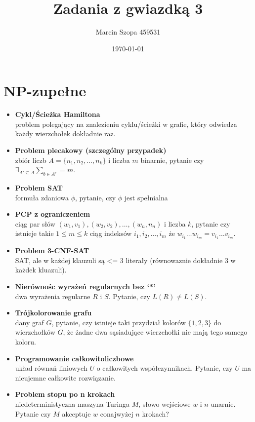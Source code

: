 \documentclass{article}
\title{Zadania z gwiazdką 3}
\author{Marcin Szopa 459531}
\date{\today}
\theoremstyle{definition}
\theoremstyle{remark}
\begin{document}
\section{NP-zupełne}

\begin{itemize}
    \item \textbf{Cykl/Ścieżka Hamiltona} \\
    problem polegający na znalezieniu cyklu/ścieżki w grafie, który odwiedza każdy wierzchołek dokładnie raz.
    
    \item \textbf{Problem plecakowy (szczególny przypadek)} \\
    zbiór liczb $A=\{n_1,n_2,\ldots,n_k\}$ i liczba $m$ binarnie, pytanie czy $\exists_{A' \subseteq A} \sum_{b \in A'}= m$.
    
    \item \textbf{Problem SAT} \\
    formuła zdaniowa $\phi$, pytanie, czy $\phi$ jest spełnialna

    \item \textbf{PCP z ograniczeniem} \\
    ciąg par słów $(w_1, v_1), (w_2, v_2), \ldots, (w_n, n_n)$ i liczba $k$,
     pytanie czy istnieje takie $1 \leq m \leq k$ ciąg indeksów $i_1, i_2, \ldots, i_m$ że $ w_{i_1} \ldots w_{i_m} = v_{i_1} \ldots v_{i_m}$.
    
    \item \textbf{Problem 3-CNF-SAT} \\
    SAT, ale w każdej klauzuli są <= 3 literały (równowaznie dokładnie 3 w każdek kluazuli).
    
    \item \textbf{Nierównośc wyrażeń regularnych bez `*'} \\
    dwa wyrażenia regularne $R$ i $S$. Pytanie, czy $L(R) \neq L(S)$.

    \item \textbf{Trójkolorowanie grafu} \\
    dany graf $G$, pytanie, czy istnieje taki przydział kolorów $\{1,2,3\}$ do wierzchołków $G$, że żadne dwa sąsiadujące wierzchołki nie mają tego samego koloru.
    
    \item \textbf{Programowanie całkowitoliczbowe} \\
    układ równań liniowych $U$ o całkowitych współczynnikach. Pytanie, czy $U$ ma nieujemne całkowite rozwiązanie.
    
    \item \textbf{Problem stopu po n krokach} \\
    niedeterministyczna maszyna Turinga $M$, słowo wejściowe $w$ i $n$ unarnie. Pytanie czy $M$ akceptuje $w$ conajwyżej $n$ krokach?
\end{itemize}
\end{document}
